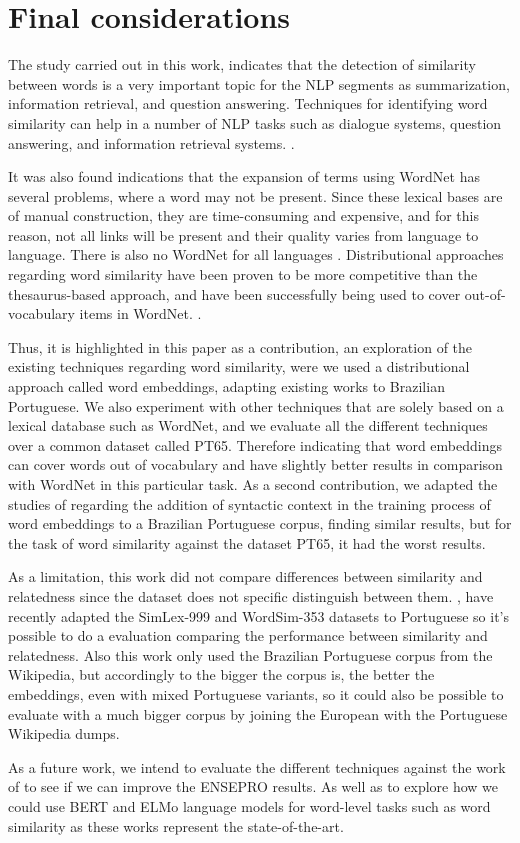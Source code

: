 \section{Final considerations}\label{chap:conclusions}

The study carried out in this work, indicates that the detection of similarity between words is a very important topic for the NLP segments as summarization, information retrieval, and question answering. Techniques for identifying word similarity can help in a number of NLP tasks such as dialogue systems, question answering, and information retrieval systems. \cite{Islam2007ApplicationsOC,Pilehvar2013,Agirre2009}.

It was also found indications that the expansion of terms using WordNet has several problems, where a word may not be present. Since these lexical bases are of manual construction, they are time-consuming and expensive, and for this reason, not all links will be present and their quality varies from language to language.  There is also no WordNet for all languages \cite{Leeuwenberga2016}. Distributional approaches regarding word similarity have been proven to be more competitive than the thesaurus-based approach, and have been successfully being used to cover out-of-vocabulary items in WordNet.  \cite{gonccalo2018distributional, Agirre2009}.

Thus, it is highlighted in this paper as a contribution, an exploration of the existing techniques regarding word similarity, were we used a distributional approach called word embeddings, adapting existing works to Brazilian Portuguese. We also experiment with other techniques that are solely based on a lexical database such as WordNet, and we evaluate all the different techniques over a common dataset called PT65. Therefore indicating that word embeddings can cover words out of vocabulary and have slightly better results in comparison with WordNet in this particular task. As a second contribution, we adapted the studies of  regarding the addition of syntactic context in the training process of word embeddings to a Brazilian Portuguese corpus, finding similar results, but for the task of word similarity against the dataset PT65, it had the worst results.

As a limitation, this work did not compare differences between similarity and relatedness since the dataset does not specific distinguish between them. , have recently adapted the SimLex-999 and WordSim-353 datasets to Portuguese so it's possible to do a evaluation comparing the performance between similarity and relatedness. Also this work only used the Brazilian Portuguese corpus from the Wikipedia, but accordingly to  the bigger the corpus is, the better the embeddings, even with mixed Portuguese variants, so it could also be possible to evaluate with a much bigger corpus by joining the European with the Portuguese Wikipedia dumps.

As a future work, we intend to evaluate the different techniques against the work of  to see if we can improve the ENSEPRO results. As well as to explore how we could use BERT and ELMo language models for word-level tasks such as word similarity as these works represent the state-of-the-art.